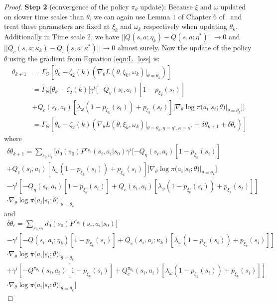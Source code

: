 \documentclass{article}
\theoremstyle{definition}
\begin{document}
\begin{proof}
\textbf{Step 2} (convergence of the policy $\pi_\theta$ update): Because $\xi$ and $\omega$ updated on slower time scales than $\theta$, we can again use Lemma $1$ of Chapter $6$ of~\cite{borkar2009stochastic} and treat these parameters are fixed at $\xi_k$ and $\omega_k$ respectively when updating $\theta_k$. Additionally in Time scale 2, we have $||Q(s,a;\eta_k)-Q(s,a;\eta^*)||\rightarrow 0$ and $||Q_c(s,a;\kappa_k)-Q_c(s,a;\kappa^*)||\rightarrow 0$ almost surely. Now the update of the policy $\theta$ using the gradient from Equation \ref{eqn:L_loss} is:
\begin{align*}
    \theta_{k+1} &=\Gamma_\Theta [ \theta_k - \zeta_2(k)( \nabla_\theta L(\theta, \xi_k, \omega_k)|_{\theta=\theta_k})] \\
    &=\Gamma_\Theta [\theta_k - \zeta_2(k)[\gamma^t [-Q_\eta(s_t,a_t) [1 - p_{\xi_k}(s_t)] \\
    &+ Q_c(s_t,a_t) [\lambda_\omega (1 - p_{\xi_k}(s_t)) + p_{\xi_k}(s_t)]]\nabla_\theta \log \pi(a_t | s_t; \theta) |_{\theta=\theta_k}]]\\
    &=\Gamma_\Theta [ \theta_k - \zeta_2(k) (\nabla_\theta L(\theta, \xi_k, \omega_k)|_{\theta=\theta_k, \eta=\eta^*, \kappa=\kappa^*} + \delta\theta_{k+1} + \delta\theta_\epsilon)]
\end{align*}
where
\begin{align*}
    \delta \theta_{k+1} = \sum_{s_i,a_i} \biggl[d_0(s_0)P^{\pi_{\theta_k}}(s_i,a_i|s_0) \gamma^i [-Q_\eta(s_i,a_i) [1 - p_{\xi_k}(s_i)] &\\
    + Q_c(s_i,a_i) [\lambda_\omega (1 - p_{\xi_k}(s_i)) + p_{\xi_k}(s_i)]]\nabla_\theta \log \pi(a_i | s_i; \theta) |_{\theta=\theta_k}\biggr] &\\ 
    - \gamma^t [-Q_\eta(s_t,a_t) [1 - p_{\xi_k}(s_t)] + Q_c(s_t,a_t) [\lambda_\omega (1 - p_{\xi_k}(s_t)) + p_{\xi_k}(s_t)]] &\\
    \cdot\nabla_\theta \log \pi(a_t | s_t; \theta) |_{\theta=\theta_k} &
\end{align*}
and
\begin{align*}
    \delta \theta_\epsilon = \sum_{s_i,a_i} d_0(s_0)P^{\pi_{\theta_k}}(s_i,a_i|s_0)\biggl[\\
    - \gamma^i [-Q(s_i,a_i;\eta_k) [1 - p_{\xi_k}(s_i)] + Q_c(s_i,a_i; \kappa_k) [\lambda_\omega (1 - p_{\xi_k}(s_i)) + p_{\xi_k}(s_i)]] &\\ 
    \cdot\nabla_\theta \log \pi(a_i | s_i; \theta) |_{\theta=\theta_k} &\\
    + \gamma^i [-Q^{\pi_{\theta_k}}(s_i,a_i) [1 - p_{\xi_k}(s_i)] + Q^{\pi_{\theta_k}}_c(s_i,a_i) [\lambda_\omega (1 - p_{\xi_k}(s_i)) + p_{\xi_k}(s_i)]] &\\
    \cdot\nabla_\theta \log \pi(a_i | s_i; \theta) |_{\theta=\theta_k}
    \biggr] &
\end{align*}


\end{proof}
\end{document}
